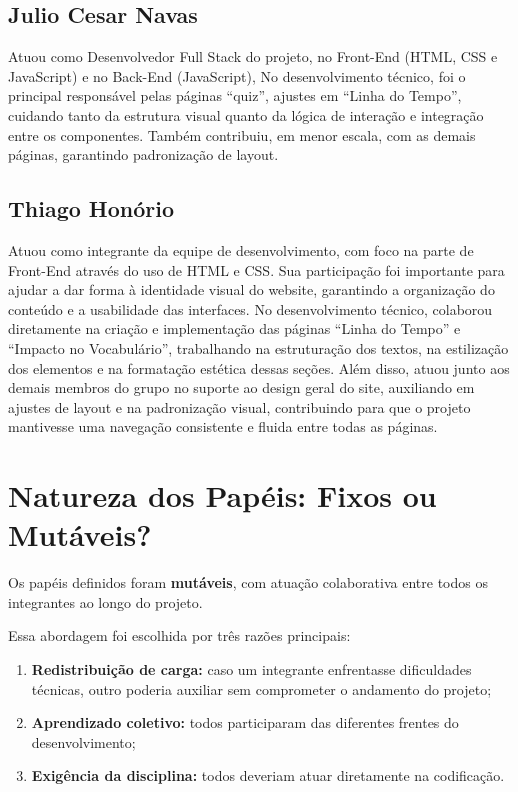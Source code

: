 \documentclass[12pt,a4paper]{article}
\begin{document}
\subsection{Julio Cesar Navas}
Atuou como Desenvolvedor Full Stack do projeto, no Front-End (HTML, CSS e JavaScript) e no Back-End (JavaScript), 
No desenvolvimento técnico, foi o principal responsável pelas páginas “quiz”, ajustes em  “Linha do Tempo”, cuidando tanto da estrutura visual quanto da lógica de interação e integração entre os componentes. Também contribuiu, em menor escala, com as demais páginas, garantindo padronização de layout.

\subsection{Thiago Honório}
Atuou como integrante da equipe de desenvolvimento, com foco na parte de Front-End através do uso de HTML e CSS. Sua participação foi importante para ajudar a dar forma à identidade visual do website, garantindo a organização do conteúdo e a usabilidade das interfaces.
No desenvolvimento técnico, colaborou diretamente na criação e implementação das páginas “Linha do Tempo” e “Impacto no Vocabulário”, trabalhando na estruturação dos textos, na estilização dos elementos e na formatação estética dessas seções.
Além disso, atuou junto aos demais membros do grupo no suporte ao design geral do site, auxiliando em ajustes de layout e na padronização visual, contribuindo para que o projeto mantivesse uma navegação consistente e fluida entre todas as páginas.

\section{Natureza dos Papéis: Fixos ou Mutáveis?}

Os papéis definidos foram \textbf{mutáveis}, com atuação colaborativa entre todos os integrantes
ao longo do projeto.

Essa abordagem foi escolhida por três razões principais:

\begin{enumerate}[leftmargin=*, label=\roman*.]
    \item \textbf{Redistribuição de carga:} caso um integrante enfrentasse dificuldades técnicas,
    outro poderia auxiliar sem comprometer o andamento do projeto;
    \item \textbf{Aprendizado coletivo:} todos participaram das diferentes frentes do
    desenvolvimento;
    \item \textbf{Exigência da disciplina:} todos deveriam atuar diretamente na codificação.
\end{enumerate}
\end{document}
